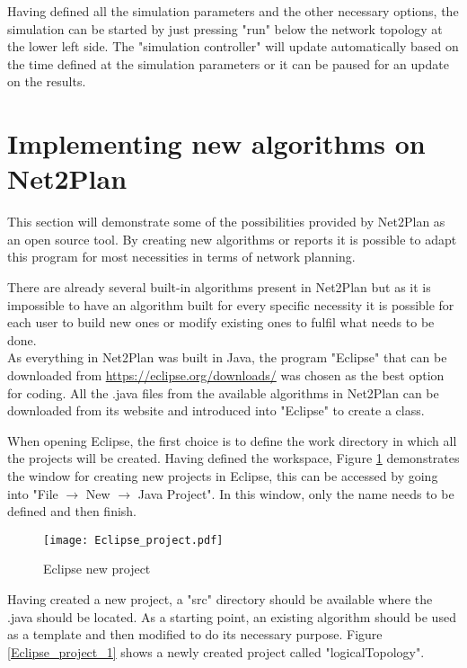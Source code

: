 \documentclass[12pt, a4paper]{article}
\begin{document}
	Having defined all the simulation parameters and the other necessary options, the simulation can be started by just pressing "run" below the network topology at the lower left side. The "simulation controller" will update automatically based on the time defined at the simulation parameters or it can be paused for an update on the results.
	
	\newpage

	\section{Implementing new algorithms on Net2Plan}
	\vspace{1cm}
	This section will demonstrate some of the possibilities provided by Net2Plan as an open source tool. By creating new algorithms or reports it is possible to adapt this program for most necessities in terms of network planning.

	There are already several built-in algorithms present in Net2Plan but as it is impossible to have an algorithm built for every specific necessity it is possible for each user to build new ones or modify existing ones to fulfil what needs to be done.\\
	
	As everything in Net2Plan was built in Java, the program "Eclipse" that can be downloaded from \url{https://eclipse.org/downloads/} was chosen as the best option for coding. All the .java files from the available algorithms in Net2Plan can be downloaded from its website and introduced into "Eclipse" to create a class.
	
	When opening Eclipse, the first choice is to define the work directory in which all the projects will be created. Having defined the workspace, Figure \ref{Eclipse_project} demonstrates the window for creating new projects in Eclipse, this can be accessed by going into "File $\rightarrow$ New $\rightarrow$ Java Project". In this window, only the name needs to be defined and then finish.
	
	\vspace{1.5cm}
	\begin{figure}[h!]
		\centering
		\texttt{[image: Eclipse\_project.pdf]}
		\caption{Eclipse new project}
		\label{Eclipse_project}
	\end{figure}	
	
	\newpage
	
	Having created a new project, a "src" directory should be available where the .java should be located. As a starting point, an existing algorithm should be used as a template and then modified to do its necessary purpose. Figure \ref{Eclipse_project_1} shows a newly created project called "logicalTopology".
	
\end{document}
